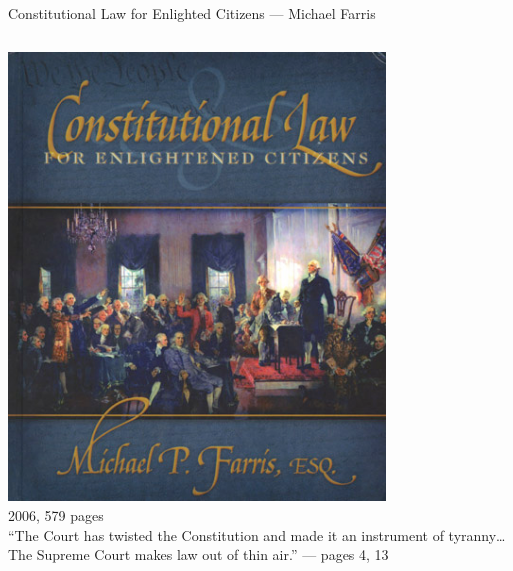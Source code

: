 \begin{frame}{Constitutional Law for Enlighted Citizens --- Michael Farris}
    \begin{columns}[onlytextwidth]
            \centering
            \includegraphics[width=0.75\textwidth]{img/constitutional-law.png} \\
            2006, 579 pages \\

            ``The Court has twisted the Constitution and made it an instrument of tyranny\ldots  The Supreme Court makes law out of thin air.'' --- pages 4, 13
    \end{columns}
\end{frame}

